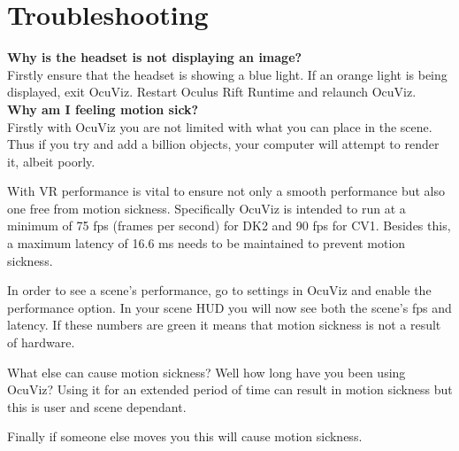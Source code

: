 \documentclass[a4paper,12pt]{article}
\begin{document}
\section{Troubleshooting}

\textbf{Why is the headset is not displaying an image?} \\ 
Firstly ensure that the headset is showing a blue light. If an orange light is being displayed, exit OcuViz. Restart Oculus Rift Runtime and relaunch OcuViz.\\

\textbf{Why am I feeling motion sick?} \\
Firstly with OcuViz you are not limited with what you can place in the scene. Thus if you try and add a billion objects, your computer will attempt to render it, albeit poorly.

With VR performance is vital to ensure not only a smooth performance but also one free from motion sickness. Specifically OcuViz is intended to run at a minimum of 75 fps (frames per second) for DK2 and 90 fps for CV1. Besides this, a maximum latency of 16.6 ms needs to be maintained to prevent motion sickness.

In order to see a scene's performance, go to settings in OcuViz and enable the performance option. In your scene HUD you will now see both the scene's fps and latency. If these numbers are green it means that motion sickness is not a result of hardware.

What else can cause motion sickness? Well how long have you been using OcuViz? Using it for an extended period of time can result in motion sickness but this is user and scene dependant. 

Finally if someone else moves you this will cause motion sickness.

%
%
\end{document}
